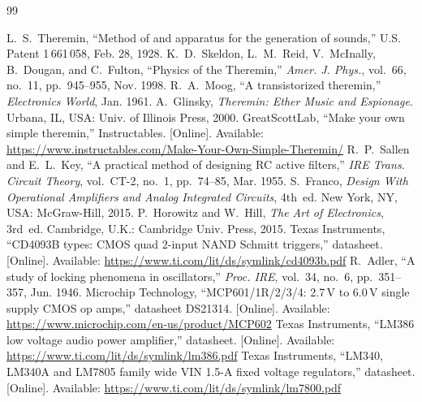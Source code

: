 \documentclass[conference]{IEEEtran}
\begin{document}
\begin{thebibliography}{99}
\footnotesize
\raggedright
{} L.~S.~Theremin, ``Method of and apparatus for the generation of sounds,'' U.S. Patent 1\,661\,058, Feb. 28, 1928.
 K.~D.~Skeldon, L.~M.~Reid, V.~McInally, B.~Dougan, and C.~Fulton, ``Physics of the Theremin,'' \emph{Amer. J. Phys.}, vol.~66, no.~11, pp.~945--955, Nov. 1998.
 R.~A.~Moog, ``A transistorized theremin,'' \emph{Electronics World}, Jan. 1961.
 A.~Glinsky, \emph{Theremin: Ether Music and Espionage}. Urbana, IL, USA: Univ. of Illinois Press, 2000.
 GreatScottLab, ``Make your own simple theremin,'' Instructables. [Online]. Available: \url{https://www.instructables.com/Make-Your-Own-Simple-Theremin/}
 R.~P.~Sallen and E.~L.~Key, ``A practical method of designing RC active filters,'' \emph{IRE Trans. Circuit Theory}, vol.~CT-2, no.~1, pp.~74--85, Mar. 1955.
 S.~Franco, \emph{Design With Operational Amplifiers and Analog Integrated Circuits}, 4th~ed. New York, NY, USA: McGraw-Hill, 2015.
 P.~Horowitz and W.~Hill, \emph{The Art of Electronics}, 3rd~ed. Cambridge, U.K.: Cambridge Univ. Press, 2015.
 Texas Instruments, ``CD4093B types: CMOS quad 2-input NAND Schmitt triggers,'' datasheet. [Online]. Available: \url{https://www.ti.com/lit/ds/symlink/cd4093b.pdf}
 R.~Adler, ``A study of locking phenomena in oscillators,'' \emph{Proc. IRE}, vol.~34, no.~6, pp.~351--357, Jun. 1946.
 Microchip Technology, ``MCP601/1R/2/3/4: 2.7\,V to 6.0\,V single supply CMOS op amps,'' datasheet DS21314. [Online]. Available: \url{https://www.microchip.com/en-us/product/MCP602}
 Texas Instruments, ``LM386 low voltage audio power amplifier,'' datasheet. [Online]. Available: \url{https://www.ti.com/lit/ds/symlink/lm386.pdf}
 Texas Instruments, ``LM340, LM340A and LM7805 family wide VIN 1.5-A fixed voltage regulators,'' datasheet. [Online]. Available: \url{https://www.ti.com/lit/ds/symlink/lm7800.pdf}
\end{thebibliography}
\end{document}
